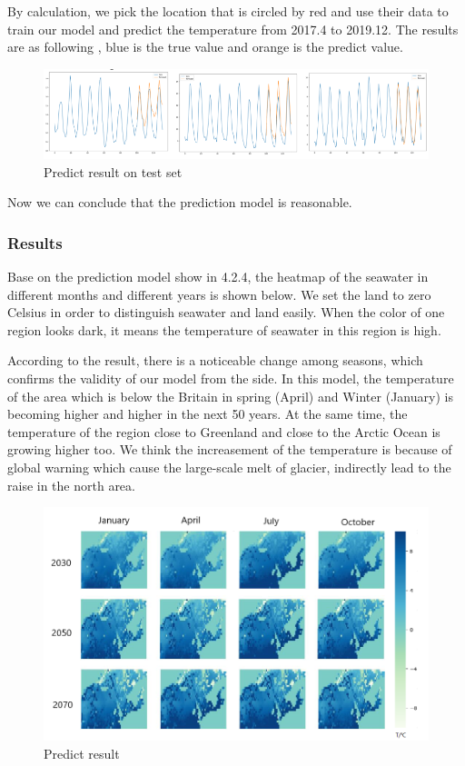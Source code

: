 \documentclass{mcmthesis}
\begin{document}
By calculation, we pick the location that is circled by red and use their data to train our model and predict the temperature from 2017.4 to 2019.12. The results are as following , blue is the true value and orange is the predict value.
\textbf{}
\begin{figure}[h]
\centering
\includegraphics[width=12.5cm]{./figures/new.png}
\caption{Predict result on test set}
\end{figure}
Now we can conclude that the prediction model is reasonable.

\subsubsection{Results}
Base on the prediction model show in 4.2.4, the heatmap of the seawater in different months and different years is shown below. We set the land to zero Celsius in order to distinguish seawater and land easily. When the color of one region looks dark, it means the temperature of seawater in this region is high.

According to the result, there is a noticeable change among seasons, which confirms the validity of our model from the side. In this model, the temperature of the area which is below the Britain in spring (April) and Winter (January) is becoming higher and higher in the next 50 years. At the same time, the temperature of the region close to Greenland and close to the Arctic Ocean is growing higher too. We think the increasement of the temperature is because of global warning which cause the large-scale melt of glacier, indirectly lead to the raise in the north area.

\textbf{}
\begin{figure}[h]
\centering
\includegraphics[width=11.5cm]{./figures/f.png}
\caption{Predict result}
\end{figure}\\
\end{document}
